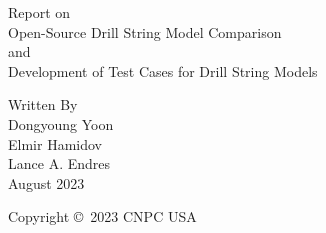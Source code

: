 \hypersetup{pageanchor=false}

\begin{titlepage}
\thispagestyle{ledateinfooter}
\bfseries

\begin{center}

\Large Report on\\
\LARGE Open-Source Drill String Model Comparison\\
\Large and\\
\LARGE Development of Test Cases for Drill String Models


\vfill

\large Written By\\
\Large Dongyoung Yoon\\
\Large Elmir Hamidov\\
\Large Lance A. Endres\\
\vspace*{2pt}
\large August 2023

\vfill

\normalsize Copyright \copyright\ 2023 CNPC USA
\end{center}

\normalsize
\end{titlepage}

\hypersetup{pageanchor=true} 